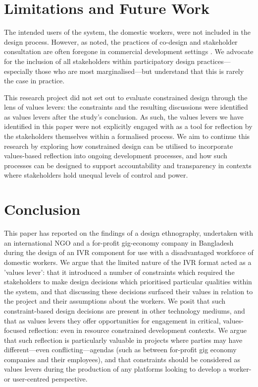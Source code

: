 \section{Limitations and Future Work}

The intended users of the system, the domestic workers, were not included in the design process. However, as noted, the practices of co-design and stakeholder consultation are often foregone in commercial development settings \cite{Ardito2014, Shilton2013}. We advocate for the inclusion of all stakeholders within participatory design practices---especially those who are most marginalised---but understand that this is rarely the case in practice.

This research project did not set out to evaluate constrained design through the lens of values levers: the constraints and the resulting discussions were identified as values levers after the study's conclusion. As such, the values levers we have identified in this paper were not explicitly engaged with as a tool for reflection by the stakeholders themselves within a formalised process. We aim to continue this research by exploring how constrained design can be utilised to incorporate values-based reflection into ongoing development processes, and how such processes can be designed to support accountability and transparency in contexts where stakeholders hold unequal levels of control and power.

\section{Conclusion}

This paper has reported on the findings of a design ethnography, undertaken with an international NGO and a for-profit gig-economy company in Bangladesh during the design of an IVR component for use with a disadvantaged workforce of domestic workers. We argue that the limited nature of the IVR format acted as a 'values lever': that it introduced a number of constraints which required the stakeholders to make design decisions which prioritised particular qualities within the system, and that discussing these decisions surfaced their values in relation to the project and their assumptions about the workers. We posit that such constraint-based design decisions are present in other technology mediums, and that as values levers they offer opportunities for engagement in critical, values-focused reflection: even in resource constrained development contexts. We argue that such reflection is particularly valuable in projects where parties may have different---even conflicting---agendas (such as between for-profit gig economy companies and their employees), and that constraints should be considered as values levers during the production of any platforms looking to develop a worker- or user-centred perspective.